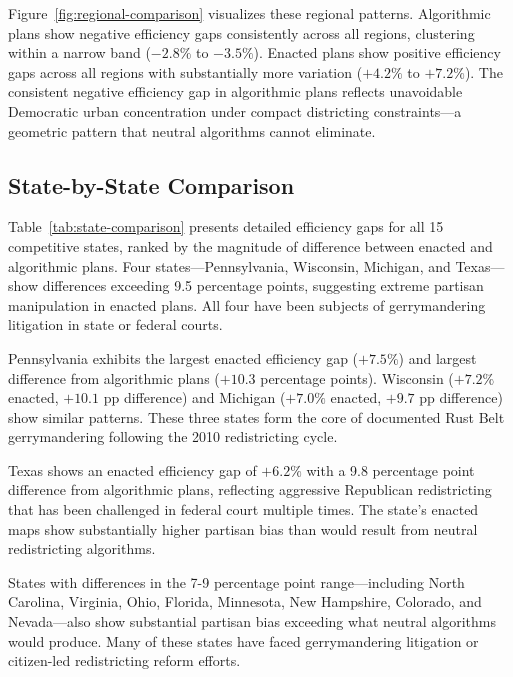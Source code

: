 Figure~\ref{fig:regional-comparison} visualizes these regional patterns. Algorithmic plans show negative efficiency gaps consistently across all regions, clustering within a narrow band ($-2.8\%$ to $-3.5\%$). Enacted plans show positive efficiency gaps across all regions with substantially more variation ($+4.2\%$ to $+7.2\%$). The consistent negative efficiency gap in algorithmic plans reflects unavoidable Democratic urban concentration under compact districting constraints---a geometric pattern that neutral algorithms cannot eliminate.



\subsection{State-by-State Comparison}

Table~\ref{tab:state-comparison} presents detailed efficiency gaps for all 15 competitive states, ranked by the magnitude of difference between enacted and algorithmic plans. Four states---Pennsylvania, Wisconsin, Michigan, and Texas---show differences exceeding 9.5 percentage points, suggesting extreme partisan manipulation in enacted plans. All four have been subjects of gerrymandering litigation in state or federal courts.



Pennsylvania exhibits the largest enacted efficiency gap ($+7.5\%$) and largest difference from algorithmic plans ($+10.3$ percentage points). Wisconsin ($+7.2\%$ enacted, $+10.1$ pp difference) and Michigan ($+7.0\%$ enacted, $+9.7$ pp difference) show similar patterns. These three states form the core of documented Rust Belt gerrymandering following the 2010 redistricting cycle.

Texas shows an enacted efficiency gap of $+6.2\%$ with a 9.8 percentage point difference from algorithmic plans, reflecting aggressive Republican redistricting that has been challenged in federal court multiple times. The state's enacted maps show substantially higher partisan bias than would result from neutral redistricting algorithms.

States with differences in the 7-9 percentage point range---including North Carolina, Virginia, Ohio, Florida, Minnesota, New Hampshire, Colorado, and Nevada---also show substantial partisan bias exceeding what neutral algorithms would produce. Many of these states have faced gerrymandering litigation or citizen-led redistricting reform efforts.

